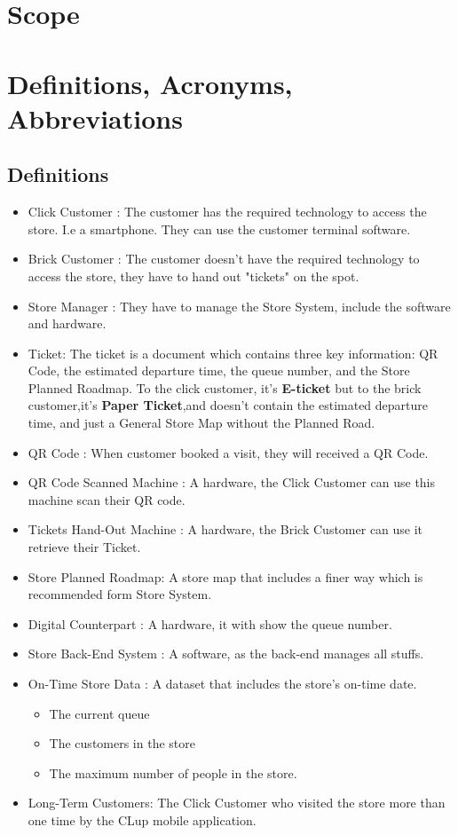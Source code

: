 \documentclass[a4paper,12pt]{report}
\begin{document}
\section{Scope}


\section{Definitions, Acronyms, Abbreviations}
\subsection{Definitions} \label{subsec:definitions}
\begin{itemize}
	\item Click Customer : The customer has the required technology to access the store.
							I.e a smartphone.
							They can use the customer terminal software.
	\item Brick Customer : The customer doesn't have the required technology to access the store, they have to hand out "tickets" on the spot.
	\item Store Manager : They have to manage the Store System, include the software and hardware.
	\item Ticket: The ticket is a document which contains three key information: QR Code, the estimated departure time, the queue number, and the Store Planned Roadmap.
					To the click customer, it's \textbf{E-ticket} but to the brick customer,it's \textbf{Paper Ticket},and doesn't contain the estimated departure time, and just a General Store Map without the Planned Road.
	\item QR Code : When customer booked a visit, they will received a QR Code.
	\item QR Code Scanned Machine : A hardware, the Click Customer can use this machine scan their QR code.
	\item Tickets Hand-Out Machine : A hardware, the Brick Customer can use it retrieve their Ticket.
	\item Store Planned Roadmap: A store map that includes a finer way which is recommended form Store System.
	\item Digital Counterpart : A hardware, it with show the queue number.
	\item Store Back-End System : A software, as the back-end manages all stuffs.
	\item On-Time Store Data : A dataset that includes the store's on-time date.
	\begin{itemize}
		\item The current queue
		\item The customers in the store
		\item The maximum number of people in the store.
	\end{itemize}
	\item Long-Term Customers: The Click Customer who visited the store more than one time by the CLup mobile application.
\end{itemize}
\end{document}

